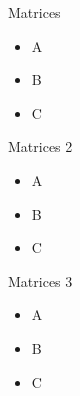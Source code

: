 \begin{frame}{Matrices}
    \begin{itemize}
        \item A
        \item B
        \item C
    \end{itemize}
\end{frame}

\begin{frame}{Matrices 2}
    \begin{itemize}
        \item A
        \item B
        \item C
    \end{itemize}
\end{frame}

\begin{frame}{Matrices 3}
    \begin{itemize}
        \item A
        \item B
        \item C
    \end{itemize}
\end{frame}